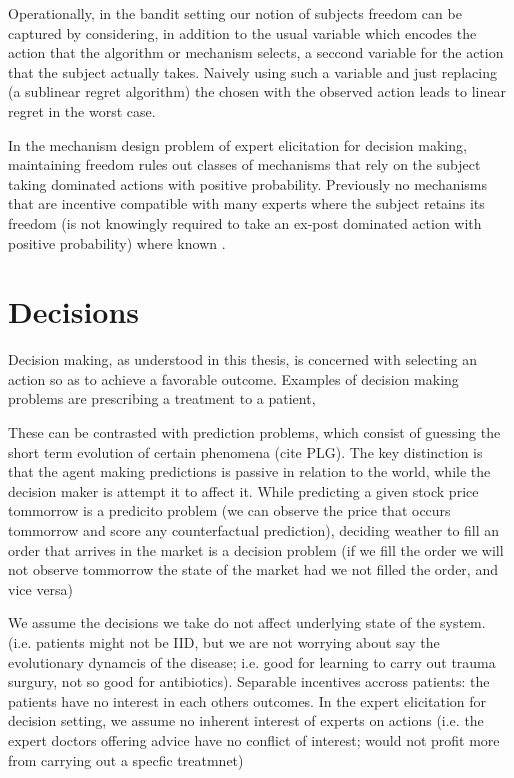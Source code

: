 Operationally, in the bandit setting our notion of subjects freedom can be captured by considering, in addition to the usual variable which encodes the action that the algorithm  or mechanism selects, a seccond variable for the action that the subject actually takes. Naively using such a variable and just replacing (a sublinear regret algorithm) the chosen with the observed action leads to linear regret in the worst case. 

In the mechanism design problem of expert elicitation for decision making, maintaining freedom rules out classes of mechanisms that rely on the subject taking dominated actions with positive probability. Previously no  mechanisms that are incentive compatible with many experts where the subject retains its freedom (is not knowingly required to take an ex-post dominated action with positive probability) where known \cite{othman2010decision,chen2014eliciting}.



\section{Decisions}

Decision making, as understood in this thesis, is concerned with selecting an action so as to achieve a favorable outcome. 
Examples of decision making problems are prescribing a treatment to a patient, 

These can be contrasted with prediction problems, which consist of guessing the short term evolution of certain phenomena (cite PLG).
The key distinction is that the agent making predictions is passive in relation to the world, while the decision maker is attempt it to affect it.
While predicting a given stock price tommorrow is a predicito problem (we can observe the price that occurs tommorrow and score any counterfactual prediction), deciding weather to fill an order that arrives in the market is a decision problem (if we fill the order we will not observe tommorrow the state of the market had we not filled the order, and vice versa)


We assume the decisions we take do not affect underlying state of the system. (i.e. patients might not be IID, but we are not worrying about say the evolutionary dynamcis of the disease; i.e. good for learning to carry out trauma surgury, not so good for antibiotics).  Separable incentives accross patients: the patients have no interest in each others outcomes. 
In the expert elicitation for decision setting, we assume no inherent interest of experts on actions (i.e. the expert doctors offering advice have no conflict of interest; would not profit more from carrying out a specfic treatmnet) 


